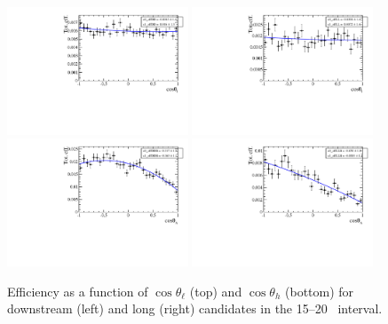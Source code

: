 \begin{figure}[h]
\centering
\includegraphics[width=0.48\textwidth]{Lmumu/figs/efficiencies/angular/DDeffFit_q2_1500_2000.pdf}
\includegraphics[width=0.48\textwidth]{Lmumu/figs/efficiencies/angular/LLeffFit_q2_1500_2000.pdf}
\includegraphics[width=0.48\textwidth]{Lmumu/figs/efficiencies/angular/DDeffFitB_q2_1500_2000.pdf}
\includegraphics[width=0.48\textwidth]{Lmumu/figs/efficiencies/angular/LLeffFitB_q2_1500_2000.pdf}
\caption{Efficiency as a function of $\cos\theta_\ell$ (top) and $\cos\theta_h$ (bottom) for
downstream (left) and long (right) candidates in the 15--20 \gevgevcccc ~\qsq interval.  }
\label{fig:cosThetaBeff}
\end{figure}
%
